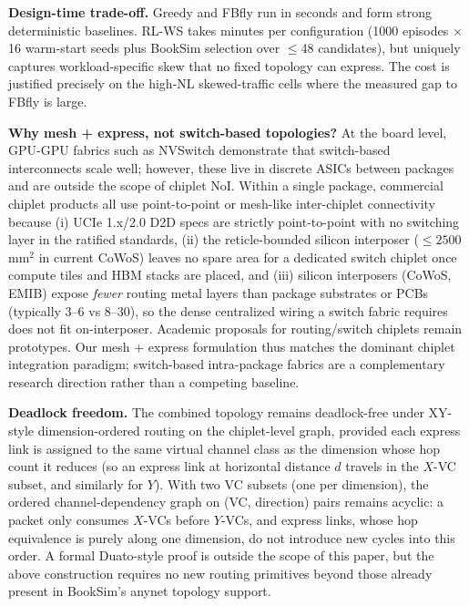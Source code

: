 \documentclass[conference]{IEEEtran}
\begin{document}
\textbf{Design-time trade-off.} Greedy and FBfly run in seconds and form strong deterministic baselines. RL-WS takes minutes per configuration (1000 episodes $\times$ 16 warm-start seeds plus BookSim selection over $\le$48 candidates), but uniquely captures workload-specific skew that no fixed topology can express. The cost is justified precisely on the high-NL skewed-traffic cells where the measured gap to FBfly is large.

\textbf{Why mesh + express, not switch-based topologies?}
At the board level, GPU-GPU fabrics such as NVSwitch demonstrate that switch-based interconnects scale well; however, these live in discrete ASICs between packages and are outside the scope of chiplet NoI. Within a single package, commercial chiplet products all use point-to-point or mesh-like inter-chiplet connectivity because (i) UCIe 1.x/2.0 D2D specs are strictly point-to-point with no switching layer in the ratified standards, (ii) the reticle-bounded silicon interposer ($\le 2500$\,mm$^2$ in current CoWoS) leaves no spare area for a dedicated switch chiplet once compute tiles and HBM stacks are placed, and (iii) silicon interposers (CoWoS, EMIB) expose \textit{fewer} routing metal layers than package substrates or PCBs (typically 3--6 vs 8--30), so the dense centralized wiring a switch fabric requires does not fit on-interposer. Academic proposals for routing/switch chiplets remain prototypes. Our mesh + express formulation thus matches the dominant chiplet integration paradigm; switch-based intra-package fabrics are a complementary research direction rather than a competing baseline.

\textbf{Deadlock freedom.}
The combined topology remains deadlock-free under XY-style dimension-ordered routing on the chiplet-level graph, provided each express link is assigned to the same virtual channel class as the dimension whose hop count it reduces (so an express link at horizontal distance $d$ travels in the $X$-VC subset, and similarly for $Y$). With two VC subsets (one per dimension), the ordered channel-dependency graph on (VC, direction) pairs remains acyclic: a packet only consumes $X$-VCs before $Y$-VCs, and express links, whose hop equivalence is purely along one dimension, do not introduce new cycles into this order. A formal Duato-style proof is outside the scope of this paper, but the above construction requires no new routing primitives beyond those already present in BookSim's anynet topology support.
\end{document}
